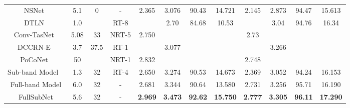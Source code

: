 \documentclass{article}
\begin{document}
\begin{table*}[!t]
{\begin{tabular}{@{}cccccccccccc@{}}
            NSNet~\cite{dns_1_nsnet}           & 5.1                                        & 0                                           & -                     & 2.365                           & 3.076                              & 90.43          & 14.721          & 2.145          & 2.873          & 94.47          & 15.613          \\
            DTLN~\cite{DTLN}                   & 1.0                                        &                                             & RT-8                  &                                 & 2.70                               & 84.68          & 10.53           &                & 3.04           & 94.76          & 16.34           \\
            Conv-TasNet~\cite{dns_conv_tasnet} & 5.08                                       & 33                                          & NRT-5                 & 2.750                           &                                    &                &                 & 2.73           &                &                &                 \\
            DCCRN-E~\cite{DCCRN}                 & 3.7                                        & 37.5                                        & RT-1                  &                                 & 3.077                              &                &                 &                & 3.266          &                &                 \\
            PoCoNet~\cite{PoCoNet}             & 50                                         &                                             & NRT-1                 & 2.832                           &                                    &                &                 & 2.748          &                &                &                 \\
            \midrule
            Sub-band Model ~\cite{sub_dns_xiaofeili}  & 1.3                                        & 32                                          & RT-4                  & 2.650                           & 3.274                              & 90.53          & 14.673          & 2.369          & 3.052          & 94.24          & 16.153          \\
            Full-band Model                        & 6.0                                        & 32                                          & -                     & 2.681                           & 3.344                              & 90.64          & 13.580          & 2.731          & 3.256          & 95.71          & 16.190          \\
            FullSubNet                            & 5.6                                        & 32                                          & -                     & \textbf{2.969}                  & \textbf{3.473}                     & \textbf{92.62} & \textbf{15.750} & \textbf{2.777} & \textbf{3.305} & \textbf{96.11} & \textbf{17.290} \\
            \bottomrule
        \end{tabular}
    }
    \label{tab:baselines}
    \vspace{-.6cm}


\end{table*}
\end{document}
